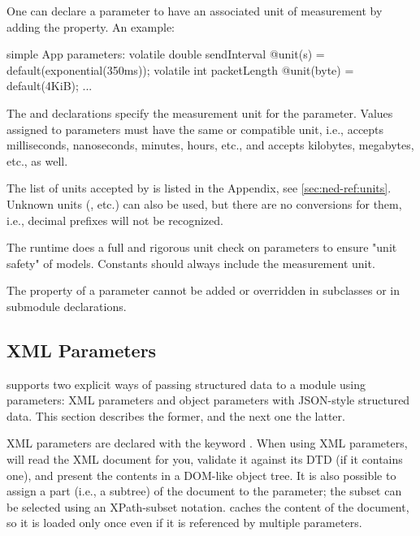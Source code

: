 One can declare a parameter to have an associated unit of measurement by adding
the  property. An example:

\begin{ned}
simple App
{
    parameters:
        volatile double sendInterval @unit(s) = default(exponential(350ms));
        volatile int packetLength @unit(byte) = default(4KiB);
    ...
}
\end{ned}

The  and  declarations specify the measurement
unit for the parameter. Values assigned to parameters must have the same or
compatible unit, i.e.,  accepts milliseconds, nanoseconds,
minutes, hours, etc., and  accepts kilobytes, megabytes, etc.,
as well.

\begin{note}
    The list of units accepted by {\opp} is listed in the Appendix, see
    \ref{sec:ned-ref:units}. Unknown units (, etc.) can also be
    used, but there are no conversions for them, i.e., decimal prefixes will not
    be recognized.
\end{note}

The {\opp} runtime does a full and rigorous unit check on parameters to ensure
"unit safety" of models. Constants should always include the measurement unit.

The  property of a parameter cannot be added or overridden in
subclasses or in submodule declarations.

\subsection{XML Parameters}
\label{sec:ned-lang:xml-parameters}

{\opp} supports two explicit ways of passing structured data to a module using
parameters: XML parameters and object parameters with JSON-style structured
data. This section describes the former, and the next one the latter.

XML parameters are declared with the keyword . When using XML
parameters, {\opp} will read the XML document for you, validate it against its
DTD (if it contains one), and present the contents in a DOM-like object tree. It
is also possible to assign a part (i.e., a subtree) of the document to the
parameter; the subset can be selected using an XPath-subset notation. {\opp}
caches the content of the document, so it is loaded only once even if it is
referenced by multiple parameters.

